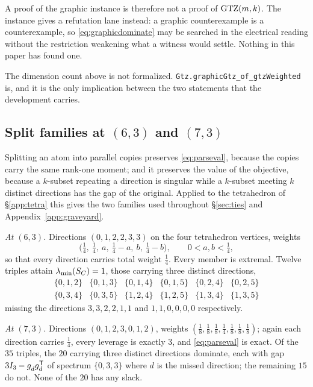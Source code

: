 A proof of the graphic instance is therefore not a proof of $\mathrm{GTZ}(m,k)$.  The
instance gives a refutation lane instead: a graphic counterexample is a
counterexample, so \eqref{eq:graphicdominate} may be searched in the
electrical reading without the restriction weakening what a witness would
settle.  Nothing in this paper has found one.

The dimension count above is not formalized.
\texttt{Gtz.graphic\allowbreak Gtz\_of\_gtz\allowbreak Weighted} is, and it
is the only implication between the two statements that the development
carries.

\subsection{Split families at
\texorpdfstring{$(6,3)$ and $(7,3)$}{(6,3) and (7,3)}}\label{app:split}

Splitting an atom into parallel copies preserves \eqref{eq:parseval}, because
the copies carry the same rank-one moment; and it preserves the value of the
objective, because a $k$-subset repeating a direction is singular while a
$k$-subset meeting $k$ distinct directions has the gap of the original.
Applied to the tetrahedron of \S\ref{app:tetra} this gives the two families
used throughout \S\ref{sec:ties} and Appendix~\ref{app:graveyard}.

\emph{At $(6,3)$.}  Directions $(0,1,2,2,3,3)$ on the four tetrahedron
vertices, weights
\[
  \bigl(\tfrac14,\ \tfrac14,\ a,\ \tfrac14-a,\ b,\ \tfrac14-b\bigr),
  \qquad 0<a,b<\tfrac14 ,
\]
so that every direction carries total weight $\tfrac14$.  Every member is
extremal.  Twelve triples attain $\lambda_{\min}(S_{C})=1$, those carrying three
distinct directions,
\[
  \begin{array}{cccccc}
   \{0,1,2\}&\{0,1,3\}&\{0,1,4\}&\{0,1,5\}&\{0,2,4\}&\{0,2,5\}\\
   \{0,3,4\}&\{0,3,5\}&\{1,2,4\}&\{1,2,5\}&\{1,3,4\}&\{1,3,5\}
  \end{array}
\]
missing the directions $3,3,2,2,1,1$ and $1,1,0,0,0,0$ respectively.

\emph{At $(7,3)$.}  Directions $(0,1,2,3,0,1,2)$, weights
$(\tfrac18,\tfrac18,\tfrac18,\tfrac14,\tfrac18,\tfrac18,\tfrac18)$; again each
direction carries $\tfrac14$, every leverage is exactly $3$, and
\eqref{eq:parseval} is exact.  Of the $35$ triples, the $20$ carrying three
distinct directions dominate, each with gap
$3I_3-g_d^{\vphantom{\mathsf{T}}}g_d\tp$ of spectrum $\{0,3,3\}$ where $d$ is the
missed direction; the remaining $15$ do not.  None of the $20$ has any slack.

